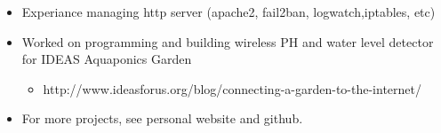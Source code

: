 \documentclass[font = 22]{article}
\begin{document}
\begin{itemize}
\begin{itemize}
    \item Experiance managing http server (apache2, fail2ban, logwatch,iptables, etc)
    
    \item Worked on programming and building wireless PH and water level detector for IDEAS Aquaponics Garden
        \begin{itemize}
            \item http://www.ideasforus.org/blog/connecting-a-garden-to-the-internet/
        \end{itemize}
        \item For more projects, see personal website and github.  
    \end{itemize}


\end{itemize}
\end{document}
